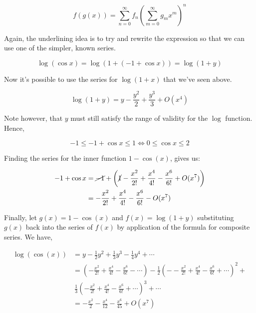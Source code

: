\documentclass[english,course]{Notes}
\begin{document}
\begin{enumerate}
	$$f ( g ( x ) ) = \sum _ { n = 0 } ^ { \infty } f _ { n } \left( \sum _ { m = 0 } ^ { \infty } g _ { m } x ^ { m } \right) ^ { n }$$
	
	
	\par{Again, the underlining idea is to try and rewrite the expression so that we can use one of the simpler, known series.}
	
	$$ \log ( \cos x ) = \log \left( 1 + \boxed{( - 1 + \cos x )} \right) = \log ( 1 + y ) $$
	
	\par{Now it's possible to use the series for $ \log(1+x)$ that we've seen above.}
	
	$$ \log ( 1 + y ) = y - \frac{y^2}{2} + \frac{y^3}{3} + O(x^4) $$
	
	\par{ Note however, that $y$ must still satisfy the range of validity for the $\log$ function. Hence,}
	
	$$- 1 \leqslant - 1 + \cos x \leqslant 1 \iff 0 \leqslant \cos x \leqslant 2 $$
	
	\par{Finding the series for the inner function $1-\cos(x)$, gives us:}
	
	$$\begin{aligned} - 1 + \cos x & = \cancel{- 1} +  \left( \cancel{1} - \frac { x ^ { 2 } } { 2 ! } + \frac { x ^ { 4 } } { 4 ! } - \frac { x ^ { 6 } } { 6 ! } + O(x^7) \right) \\ & = - \frac { x ^ { 2 } } { 2 ! } + \frac { x ^ { 4 } } { 4 ! } - \frac { x ^ { 6 } } { 6 ! } - O(x^7) \end{aligned}$$
	
	\par{Finally, let $g(x) = 1- \cos(x)$ and $f(x) = \log(1+y)$ substituting $g(x)$ back into the series of $f(x)$ by application of the formula for composite series. We have,}
	
	$$\begin{aligned}
		\log\left(\cos(x)\right) &= y - \frac { 1 } { 2 } y ^ { 2 } + \frac { 1 } { 3 } y ^ { 3 } - \frac { 1 } { 4 } y ^ { 4 } + \cdots \\
			&= \left( - \frac { x ^ { 2 } } { 2 ! } + \frac { x ^ { 4 } } { 4 ! } - \frac { x ^ { 6 } } { 6 ! } - \cdots \right) - \frac { 1 } { 2 } \left( - - \frac { x ^ { 2 } } { 2 ! } + \frac { x ^ { 4 } } { 4 ! } - \frac { x ^ { 6 } } { 6 !} + \cdots \right) ^ { 2 } +  \\ & \ \frac { 1 } { 3 } \left( - \frac { x ^ { 2 } } { 2 ! } + \frac { x ^ { 4 } } { 4 ! } - \frac { x ^ { 6 } } { 6 !} + \cdots \right) ^ { 3 } + \cdots \\
			&= - \frac { x ^ { 2 } } { 2 } - \frac { x ^ { 4 } } { 12 } - \frac { x ^ { 6 } } { 45 } + O(x^7)
			\end{aligned}$$

\end{enumerate}
\end{document}
